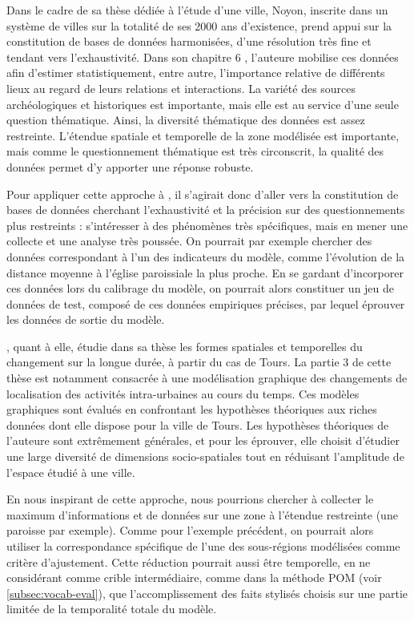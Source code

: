 Dans le cadre de sa thèse dédiée à l'étude d'une ville, Noyon, inscrite dans un système de villes sur la totalité de ses 2000 ans d'existence, \textcite{gravier_deux_2018} prend appui sur la constitution de bases de données harmonisées, d'une résolution très fine et tendant vers l'exhaustivité.
Dans son chapitre 6 \autocite[pp.231--295~]{gravier_deux_2018}, l'auteure mobilise ces données afin d'estimer statistiquement, entre autre, l'importance relative de différents lieux au regard de leurs relations et interactions.
La variété des sources archéologiques et historiques est importante, mais elle est au service d'une seule question thématique.
Ainsi, la diversité thématique des données est assez restreinte.
L'étendue spatiale et temporelle de la zone modélisée est importante, mais comme le questionnement thématique est très circonscrit, la qualité des données permet d'y apporter une réponse robuste.

Pour appliquer cette approche à \simfeodal{}, il s'agirait donc d'aller vers la constitution de bases de données cherchant l'exhaustivité et la précision sur des questionnements plus restreints :
	s'intéresser à des phénomènes très spécifiques, mais en mener une collecte et une analyse très poussée.
On pourrait par exemple chercher des données correspondant à l'un des indicateurs du modèle, comme l'évolution de la distance moyenne à l'église paroissiale la plus proche.
En se gardant d'incorporer ces données lors du calibrage du modèle, on pourrait alors constituer un jeu de données de test, composé de ces données empiriques précises, par lequel éprouver les données de sortie du modèle.

\textcite{nahassia_formes_2019}, quant à elle, étudie dans sa thèse les formes spatiales et temporelles du changement sur la longue durée, à partir du cas de Tours.
La partie 3 \autocite[pp.~239--394]{nahassia_formes_2019} de cette thèse est notamment consacrée à une modélisation graphique des changements de localisation des activités intra-urbaines au cours du temps.
Ces modèles graphiques sont évalués en confrontant les hypothèses théoriques aux riches données dont elle dispose pour la ville de Tours.
Les hypothèses théoriques de l'auteure sont extrêmement générales, et pour les éprouver, elle choisit d'étudier une large diversité de dimensions socio-spatiales tout en réduisant l'amplitude de l'espace étudié à une ville.

En nous inspirant de cette approche, nous pourrions chercher à collecter le maximum d'informations et de données sur une zone à l'étendue restreinte (une paroisse par exemple).
Comme pour l'exemple précédent, on pourrait alors utiliser la correspondance spécifique de l'une des sous-régions modélisées comme critère d'ajustement.
Cette réduction pourrait aussi être temporelle, en ne considérant comme \og crible intermédiaire\fg{}, comme dans la méthode POM \autocite{grimm_pattern-oriented_2005,grimm_pattern-oriented_2012} (voir \cref{subsec:vocab-eval}), que l'accomplissement des faits stylisés choisis sur une partie limitée de la temporalité totale du modèle.

